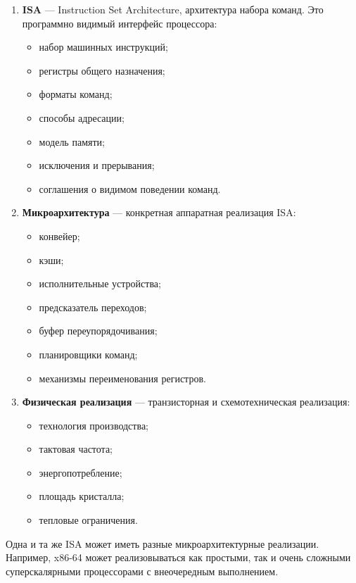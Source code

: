 \documentclass[12pt,a4paper]{article}
\begin{document}
\begin{enumerate}
    \item \textbf{ISA} --- Instruction Set Architecture, архитектура набора команд.
    Это программно видимый интерфейс процессора:
    \begin{itemize}
        \item набор машинных инструкций;
        \item регистры общего назначения;
        \item форматы команд;
        \item способы адресации;
        \item модель памяти;
        \item исключения и прерывания;
        \item соглашения о видимом поведении команд.
    \end{itemize}

    \item \textbf{Микроархитектура} --- конкретная аппаратная реализация ISA:
    \begin{itemize}
        \item конвейер;
        \item кэши;
        \item исполнительные устройства;
        \item предсказатель переходов;
        \item буфер переупорядочивания;
        \item планировщики команд;
        \item механизмы переименования регистров.
    \end{itemize}

    \item \textbf{Физическая реализация} --- транзисторная и схемотехническая реализация:
    \begin{itemize}
        \item технология производства;
        \item тактовая частота;
        \item энергопотребление;
        \item площадь кристалла;
        \item тепловые ограничения.
    \end{itemize}
\end{enumerate}

Одна и та же ISA может иметь разные микроархитектурные реализации. Например, x86-64 может реализовываться как простыми, так и очень сложными суперскалярными процессорами с внеочередным выполнением.
\end{document}

